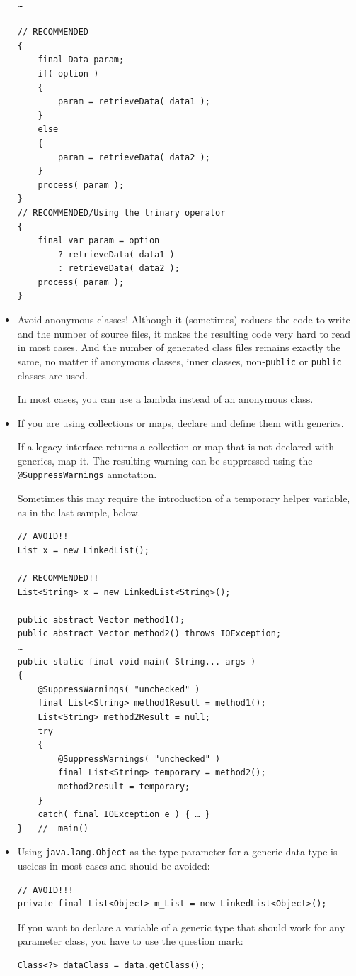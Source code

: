 \documentclass[11pt,a4paper, titlepage, parskip=half, headsepline, footsepline, cleardoublepage=current, headheight=1cm]{scrbook}
\begin{document}
\begin{itemize}
{\begin{lstlisting}
…

// RECOMMENDED
{
    final Data param;
    if( option )
    {
        param = retrieveData( data1 );
    }
    else
    {
        param = retrieveData( data2 );
    }
    process( param );
}
// RECOMMENDED/Using the trinary operator
{
    final var param = option 
        ? retrieveData( data1 )
        : retrieveData( data2 );
    process( param );
}
\end{lstlisting}
}

\item{Avoid anonymous classes! Although it (sometimes) reduces the code to write and the number of source files, it makes the resulting code very hard to read in most cases. And the number of generated class files remains exactly the same, no matter if anonymous classes, inner classes, non-\lstinline|public| or \lstinline|public| classes are used.

In most cases, you can use a lambda instead of an anonymous class.}

\item{If you are using collections or maps, declare and define them with generics.

If a legacy interface returns a collection or map that is not declared with generics, map it. The resulting warning can be suppressed using the \lstinline|@SuppressWarnings|\autocite{ORACLE_DOC_SUPPRESSWARNINGS_ANNOTATION} annotation.

Sometimes this may require the introduction of a temporary helper variable, as in the last sample, below.

\begin{lstlisting}
// AVOID!!
List x = new LinkedList(); 

// RECOMMENDED!!
List<String> x = new LinkedList<String>(); 

public abstract Vector method1();
public abstract Vector method2() throws IOException;
…
public static final void main( String... args )
{
    @SuppressWarnings( "unchecked" )
    final List<String> method1Result = method1();
    List<String> method2Result = null;
    try
    {
        @SuppressWarnings( "unchecked" )
        final List<String> temporary = method2();
        method2result = temporary;
    }
    catch( final IOException e ) { … }
}   //  main()
\end{lstlisting}}

\item{Using \lstinline|java.lang.Object| as the type parameter for a generic data type is useless in most cases and should be avoided:
\begin{lstlisting}
// AVOID!!!
private final List<Object> m_List = new LinkedList<Object>();
\end{lstlisting}
If you want to declare a variable of a generic type that should work for any parameter class, you have to use the question mark:
\begin{lstlisting}
Class<?> dataClass = data.getClass();
\end{lstlisting}}


\end{itemize}
\end{document}
